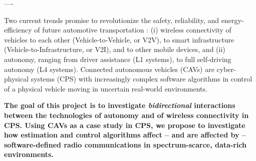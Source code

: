 ----


Two current trends promise to revolutionize the safety, reliability, and energy-efficiency of 
future automotive transportation \cite{Barbaresso2014}: (i) wireless connectivity of vehicles 
to each other 
(Vehicle-to-Vehicle, or V2V), to smart infrastructure (Vehicle-to-Infrastructure, or V2I), 
and to other mobile devices, and (ii) autonomy, 
ranging from driver assistance (L1 systems), to full self-driving autonomy (L4 systems). 
Connected autonomous vehicles (CAVs) are cyber-physical systems (CPS) with increasingly 
complex software algorithms in control of a physical vehicle moving in uncertain real-world 
environments.\vspace{\parskip}


\textbf{The goal of this project is to investigate \textit{bidirectional} 
	interactions between the technologies of autonomy and of wireless connectivity in CPS. Using 
	CAVs as a case study in CPS, we propose to investigate how estimation and control algorithms 
	affect -- and are affected by -- software-defined radio communications in spectrum-scarce, 
	data-rich environments.}\vspace{\parskip} 